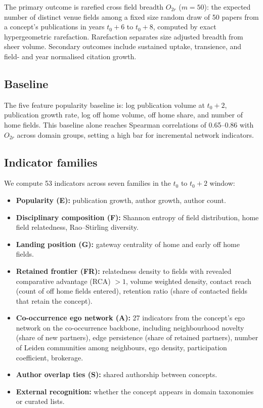 \documentclass[11pt,letterpaper]{article}
\begin{document}
The primary outcome is rarefied cross field breadth $O_{2r}$ ($m = 50$): the
expected number of distinct venue fields among a fixed size random draw of 50
papers from a concept's publications in years $t_0 + 6$ to $t_0 + 8$, computed
by exact hypergeometric rarefaction. Rarefaction separates size adjusted breadth
from sheer volume. Secondary outcomes include sustained uptake, transience, and
field- and year normalised citation growth.

\subsection{Baseline}

The five feature popularity baseline is: log publication volume at
$t_0 + 2$, publication growth rate, log off home volume, off home share, and
number of home fields. This baseline alone reaches Spearman correlations of 0.65--0.86 with
$O_{2r}$ across domain groups, setting a high bar for incremental network
indicators.

\subsection{Indicator families}

We compute 53 indicators across seven families in the $t_0$ to $t_0 + 2$
window:

\begin{itemize}
  \item \textbf{Popularity (E):} publication growth, author growth, author count.
  \item \textbf{Disciplinary composition (F):} Shannon entropy of field
    distribution, home field relatedness, Rao--Stirling diversity.
  \item \textbf{Landing position (G):} gateway centrality of home and early
    off home fields.
  \item \textbf{Retained frontier (FR):} relatedness density to fields with
    revealed comparative advantage (RCA) $> 1$, volume weighted density, contact
    reach (count of off home fields entered), retention ratio (share of contacted
    fields that retain the concept).
  \item \textbf{Co-occurrence ego network (A):} 27 indicators from the
    concept's ego network on the co-occurrence backbone, including neighbourhood
    novelty (share of new partners), edge persistence (share of retained
    partners), number of Leiden communities among neighbours, ego density,
    participation coefficient, brokerage.
  \item \textbf{Author overlap ties (S):} shared authorship between concepts.
  \item \textbf{External recognition:} whether the concept appears in domain
    taxonomies or curated lists.
\end{itemize}
\end{document}
